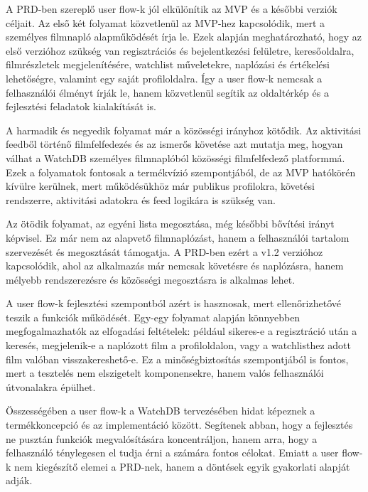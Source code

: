 A PRD-ben szereplő user flow-k jól elkülönítik az MVP és a későbbi verziók céljait. Az első két folyamat közvetlenül az MVP-hez kapcsolódik, mert a személyes filmnapló alapműködését írja le. Ezek alapján meghatározható, hogy az első verzióhoz szükség van regisztrációs és bejelentkezési felületre, keresőoldalra, filmrészletek megjelenítésére, watchlist műveletekre, naplózási és értékelési lehetőségre, valamint egy saját profiloldalra. Így a user flow-k nemcsak a felhasználói élményt írják le, hanem közvetlenül segítik az oldaltérkép és a fejlesztési feladatok kialakítását is.

A harmadik és negyedik folyamat már a közösségi irányhoz kötődik. Az aktivitási feedből történő filmfelfedezés és az ismerős követése azt mutatja meg, hogyan válhat a WatchDB személyes filmnaplóból közösségi filmfelfedező platformmá. Ezek a folyamatok fontosak a termékvízió szempontjából, de az MVP hatókörén kívülre kerülnek, mert működésükhöz már publikus profilokra, követési rendszerre, aktivitási adatokra és feed logikára is szükség van.

Az ötödik folyamat, az egyéni lista megosztása, még későbbi bővítési irányt képvisel. Ez már nem az alapvető filmnaplózást, hanem a felhasználói tartalom szervezését és megosztását támogatja. A PRD-ben ezért a v1.2 verzióhoz kapcsolódik, ahol az alkalmazás már nemcsak követésre és naplózásra, hanem mélyebb rendszerezésre és közösségi megosztásra is alkalmas lehet.

A user flow-k fejlesztési szempontból azért is hasznosak, mert ellenőrizhetővé teszik a funkciók működését. Egy-egy folyamat alapján könnyebben megfogalmazhatók az elfogadási feltételek: például sikeres-e a regisztráció után a keresés, megjelenik-e a naplózott film a profiloldalon, vagy a watchlisthez adott film valóban visszakereshető-e. Ez a minőségbiztosítás szempontjából is fontos, mert a tesztelés nem elszigetelt komponensekre, hanem valós felhasználói útvonalakra épülhet.

Összességében a user flow-k a WatchDB tervezésében hidat képeznek a termékkoncepció és az implementáció között. Segítenek abban, hogy a fejlesztés ne pusztán funkciók megvalósítására koncentráljon, hanem arra, hogy a felhasználó ténylegesen el tudja érni a számára fontos célokat. Emiatt a user flow-k nem kiegészítő elemei a PRD-nek, hanem a döntések egyik gyakorlati alapját adják.
